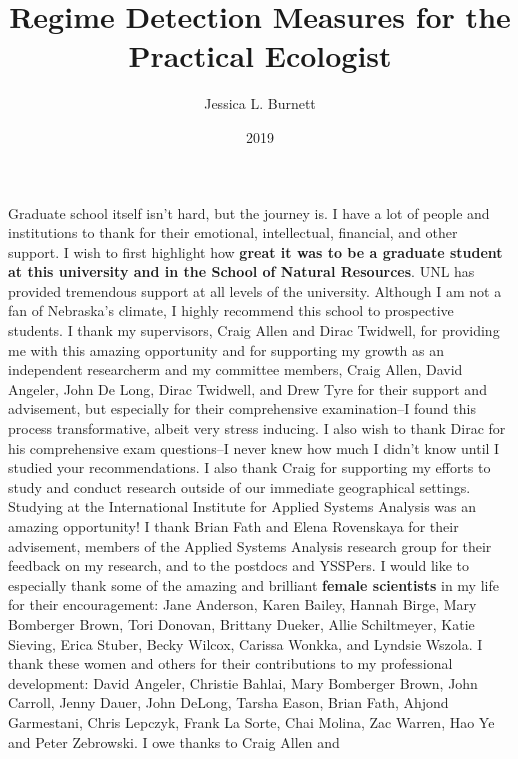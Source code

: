 \documentclass[12pt,twoside,openany]{reedthesis}
\title{Regime Detection Measures for the Practical Ecologist}
\author{Jessica L. Burnett}
\date{2019}
\begin{document}
  \maketitle

\frontmatter %
\pagestyle{empty} %
  \begin{acknowledgements}
    Graduate school itself isn't hard, but the journey is. I have a lot of
    people and institutions to thank for their emotional, intellectual,
    financial, and other support. I wish to first highlight how
    \textbf{great it was to be a graduate student at this university and in
    the School of Natural Resources}. UNL has provided tremendous support at
    all levels of the university. Although I am not a fan of Nebraska's
    climate, I highly recommend this school to prospective students. I thank
    my supervisors, Craig Allen and Dirac Twidwell, for providing me with
    this amazing opportunity and for supporting my growth as an independent
    researcherm and my committee members, Craig Allen, David Angeler, John
    De Long, Dirac Twidwell, and Drew Tyre for their support and advisement,
    but especially for their comprehensive examination--I found this process
    transformative, albeit very stress inducing. I also wish to thank Dirac
    for his comprehensive exam questions--I never knew how much I didn't
    know until I studied your recommendations. I also thank Craig for
    supporting my efforts to study and conduct research outside of our
    immediate geographical settings. Studying at the International Institute
    for Applied Systems Analysis was an amazing opportunity! I thank Brian
    Fath and Elena Rovenskaya for their advisement, members of the Applied
    Systems Analysis research group for their feedback on my research, and
    to the postdocs and YSSPers. I would like to especially thank some of
    the amazing and brilliant \textbf{female scientists} in my life for
    their encouragement: Jane Anderson, Karen Bailey, Hannah Birge, Mary
    Bomberger Brown, Tori Donovan, Brittany Dueker, Allie Schiltmeyer, Katie
    Sieving, Erica Stuber, Becky Wilcox, Carissa Wonkka, and Lyndsie Wszola.
    I thank these women and others for their contributions to my
    professional development: David Angeler, Christie Bahlai, Mary Bomberger
    Brown, John Carroll, Jenny Dauer, John DeLong, Tarsha Eason, Brian Fath,
    Ahjond Garmestani, Chris Lepczyk, Frank La Sorte, Chai Molina, Zac
    Warren, Hao Ye and Peter Zebrowski. I owe thanks to Craig Allen and

\end{acknowledgements}
\end{document}
